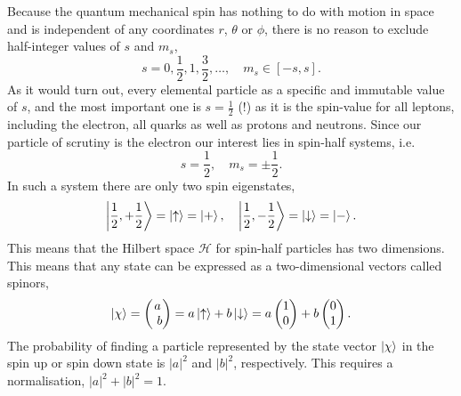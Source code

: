     Because the quantum mechanical spin has nothing to do with motion in space and 
    is independent of any coordinates $r$, $\theta$ or $\phi$, there is no reason to 
    exclude half-integer values of $s$ and $m_s$,
    \begin{equation}
        s=0,\frac{1}{2},1,\frac{3}{2},\dots, \quad m_s\in[-s, s].
    \end{equation}
    As it would turn out, every elemental particle as a specific and immutable value of 
    $s$, and the most important one is $s=\frac{1}{2}$ (!) as it is the spin-value for 
    all leptons, including the electron, all quarks as well as protons and neutrons. Since 
    our particle of scrutiny is the electron our interest lies in spin-half systems, i.e. 
    \begin{equation}
        s = \frac{1}{2}, \quad m_s = \pm \frac{1}{2}.
    \end{equation}
    In such a system there are only two spin eigenstates,
    \begin{equation}
        \ket{\frac{1}{2},+\frac{1}{2}} = \ket{\uparrow} = \ket{+}, \quad
        \ket{\frac{1}{2},-\frac{1}{2}} = \ket{\downarrow} = \ket{-}.
    \end{equation}
    This means that the Hilbert space $\mathcal{H}$ for spin-half particles has 
    two dimensions. This means that any state can be expressed as a two-dimensional 
    vectors called spinors,
    \begin{equation}
        \ket{\chi} = \begin{pmatrix}
            a \\ b
        \end{pmatrix}
        = a\ket{\uparrow} + b\ket{\downarrow}
        = a\begin{pmatrix}
            1 \\ 0 
        \end{pmatrix}
        + b\begin{pmatrix}
            0 \\ 1
        \end{pmatrix}.
    \end{equation}
    The probability of finding a particle represented by the state vector $\ket{\chi}$
    in the spin up or spin down state is $|a|^2$ and $|b|^2$, respectively. This requires 
    a normalisation, $|a|^2 + |b|^2 = 1$.

